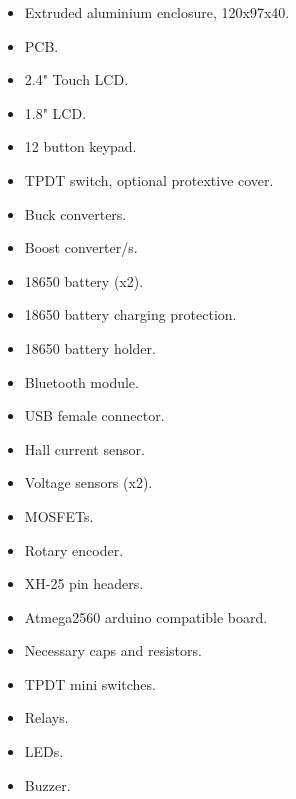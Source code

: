 \documentclass{article}
\begin{document}
\begin{itemize}
	\item Extruded aluminium enclosure, 120x97x40.
	\item PCB.
	\item 2.4" Touch LCD.
	\item 1.8" LCD.
	\item 12 button keypad.
	\item TPDT switch, optional protextive cover.
	\item Buck converters.
	\item Boost converter/s.
	\item 18650 battery (x2).
	\item 18650 battery charging protection.
	\item 18650 battery holder.
	\item Bluetooth module.
	\item USB female connector.
	\item Hall current sensor.
	\item Voltage sensors (x2).
	\item MOSFETs.
	\item Rotary encoder.
	\item XH-25 pin headers.
	\item Atmega2560 arduino compatible board.
	\item Necessary caps and resistors.
	\item TPDT mini switches.
	\item Relays.
	\item LEDs.
	\item Buzzer.
\end{itemize}
\end{document}
